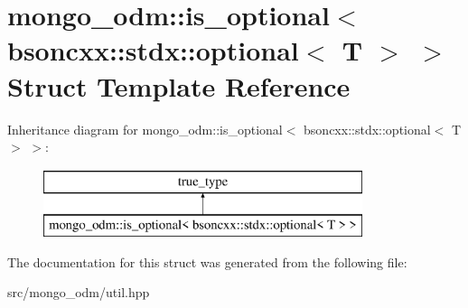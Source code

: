 \hypertarget{structmongo__odm_1_1is__optional_3_01bsoncxx_1_1stdx_1_1optional_3_01T_01_4_01_4}{}\section{mongo\+\_\+odm\+:\+:is\+\_\+optional$<$ bsoncxx\+:\+:stdx\+:\+:optional$<$ T $>$ $>$ Struct Template Reference}
\label{structmongo__odm_1_1is__optional_3_01bsoncxx_1_1stdx_1_1optional_3_01T_01_4_01_4}
Inheritance diagram for mongo\+\_\+odm\+:\+:is\+\_\+optional$<$ bsoncxx\+:\+:stdx\+:\+:optional$<$ T $>$ $>$\+:\begin{figure}[H]
\begin{center}
\leavevmode
\includegraphics[height=2.000000cm]{structmongo__odm_1_1is__optional_3_01bsoncxx_1_1stdx_1_1optional_3_01T_01_4_01_4}
\end{center}
\end{figure}


The documentation for this struct was generated from the following file\+:\begin{DoxyCompactItemize}
\item 
src/mongo\+\_\+odm/util.\+hpp\end{DoxyCompactItemize}

